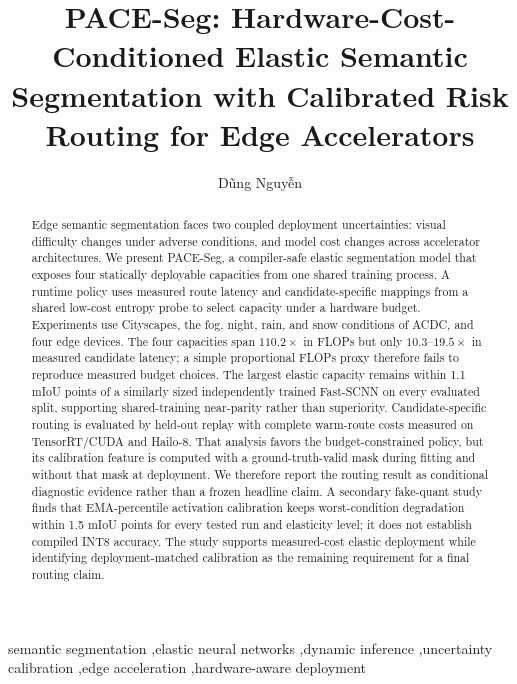 \documentclass[a4paper,review,12pt]{elsarticle}
\newcommand{\method}{PACE-Seg}
\newcommand{\miou}{mIoU}
\begin{document}
\begin{frontmatter}

\title{PACE-Seg: Hardware-Cost-Conditioned Elastic Semantic Segmentation with Calibrated Risk Routing for Edge Accelerators}

\author{Dũng Nguyễn}

\begin{abstract}
Edge semantic segmentation faces two coupled deployment uncertainties: visual difficulty changes under adverse conditions, and model cost changes across accelerator architectures. We present \method, a compiler-safe elastic segmentation model that exposes four statically deployable capacities from one shared training process. A runtime policy uses measured route latency and candidate-specific mappings from a shared low-cost entropy probe to select capacity under a hardware budget. Experiments use Cityscapes, the fog, night, rain, and snow conditions of ACDC, and four edge devices. The four capacities span $110.2\times$ in FLOPs but only $10.3$--$19.5\times$ in measured candidate latency; a simple proportional FLOPs proxy therefore fails to reproduce measured budget choices. The largest elastic capacity remains within 1.1 \miou{} points of a similarly sized independently trained Fast-SCNN on every evaluated split, supporting shared-training near-parity rather than superiority. Candidate-specific routing is evaluated by held-out replay with complete warm-route costs measured on TensorRT/CUDA and Hailo-8. That analysis favors the budget-constrained policy, but its calibration feature is computed with a ground-truth-valid mask during fitting and without that mask at deployment. We therefore report the routing result as conditional diagnostic evidence rather than a frozen headline claim. A secondary fake-quant study finds that EMA-percentile activation calibration keeps worst-condition degradation within 1.5 \miou{} points for every tested run and elasticity level; it does not establish compiled INT8 accuracy. The study supports measured-cost elastic deployment while identifying deployment-matched calibration as the remaining requirement for a final routing claim.
\end{abstract}

\begin{keyword}
semantic segmentation \sep elastic neural networks \sep dynamic inference \sep uncertainty calibration \sep edge acceleration \sep hardware-aware deployment
\end{keyword}

\end{frontmatter}
\end{document}
